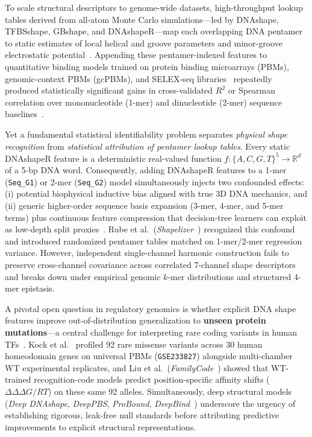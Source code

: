 \documentclass[11pt,a4paper]{article}
\begin{document}
To scale structural descriptors to genome-wide datasets, high-throughput lookup tables derived from all-atom Monte Carlo simulations---led by DNAshape, TFBSshape, GBshape, and DNAshapeR---map each overlapping DNA pentamer to static estimates of local helical and groove parameters and minor-groove electrostatic potential~\cite{zhou2013nar,yang2014nar,chiu2015nar,chiu2016bioinf,chiu2017nar,li2017nar,chiu2020nar}. Appending these pentamer-indexed features to quantitative binding models trained on protein binding microarrays (PBMs), genomic-context PBMs (gcPBMs), and SELEX-seq libraries~\cite{berger2006nbt,berger2008cell,noyes2008cell,badis2009science,jolma2013cell,riley2014mmb,weirauch2014cell} repeatedly produced statistically significant gains in cross-validated $R^2$ or Spearman correlation over mononucleotide (1-mer) and dinucleotide (2-mer) sequence baselines~\cite{mordelet2013bioinf,zhou2015pnas,dror2015genome,mathelier2016cels,yang2017msb,sielemann2021natcomm}.

Yet a fundamental statistical identifiability problem separates \emph{physical shape recognition} from \emph{statistical attribution of pentamer lookup tables}. Every static DNAshapeR feature is a deterministic real-valued function $f: \{A, C, G, T\}^5 \to \mathbb{R}^d$ of a 5-bp DNA word. Consequently, adding DNAshapeR features to a 1-mer (\texttt{Seq\_G1}) or 2-mer (\texttt{Seq\_G2}) model simultaneously injects two confounded effects: (i) potential biophysical inductive bias aligned with true 3D DNA mechanics, and (ii) generic higher-order sequence basis expansion (3-mer, 4-mer, and 5-mer terms) plus continuous feature compression that decision-tree learners can exploit as low-depth split proxies~\cite{rube2018msb,strobl2007bmc,friedman2001aos,ke2017lightgbm}. Rube et al.~(\emph{Shapelizer}~\cite{rube2018msb}) recognized this confound and introduced randomized pentamer tables matched on 1-mer/2-mer regression variance. However, independent single-channel harmonic construction fails to preserve cross-channel covariance across correlated 7-channel shape descriptors and breaks down under empirical genomic $k$-mer distributions and structured 4-mer epistasis.

A pivotal open question in regulatory genomics is whether explicit DNA shape features improve out-of-distribution generalization to \textbf{unseen protein mutations}---a central challenge for interpreting rare coding variants in human TFs~\cite{barrera2016science,demasi2011nar,christensen2012bioinf,chu2012genome,wetzel2022genome}. Kock et al.~\cite{kock2024natcomm} profiled 92 rare missense variants across 30 human homeodomain genes on universal PBMs (\texttt{GSE233827}) alongside multi-chamber WT experimental replicates, and Liu et al.~(\emph{FamilyCode}~\cite{liu2025nar}) showed that WT-trained recognition-code models predict position-specific affinity shifts ($\Delta\Delta\Delta G/RT$) on these same 92 alleles. Simultaneously, deep structural models (\emph{Deep DNAshape}, \emph{DeepPBS}, \emph{ProBound}, \emph{DeepBind}~\cite{li2024natcomm,li2024nar,mitra2024natmeth,rube2022nbt,alipanahi2015nbt,rastogi2018pnas}) underscore the urgency of establishing rigorous, leak-free null standards before attributing predictive improvements to explicit structural representations.
\end{document}
